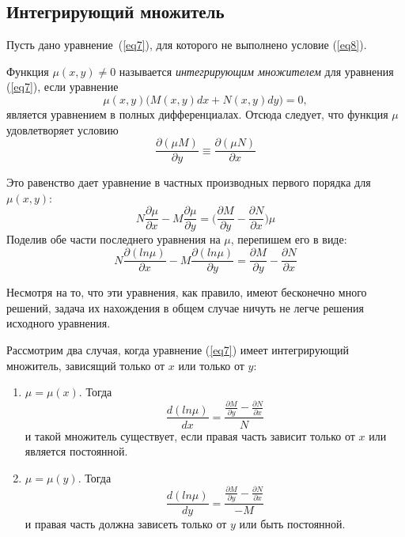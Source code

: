 \subsection*{Интегрирующий множитель}
Пусть дано уравнение~(\ref{eq7}), для которого не выполнено условие (\ref{eq8}).

\Def Функция $\mu(x, y) \neq 0$ называется \textit{интегрирующим множителем} для уравнения (\ref{eq7}), если уравнение
\begin{equation*}
    \mu(x, y)\big(M(x, y) dx + N(x, y) dy\big) = 0,
\end{equation*}
является уравнением в полных дифференциалах. Отсюда следует, что функция $\mu$ удовлетворяет условию
\begin{equation*}
    \frac{\partial(\mu M)}{\partial y} \equiv \frac{\partial(\mu N)}{\partial x}
\end{equation*}

Это равенство дает уравнение в частных производных первого порядка для $\mu(x,y)$:
\begin{equation*}
    N\frac{\partial\mu}{\partial x} - M\frac{\partial\mu}{\partial y} = \Big(\frac{\partial M}{\partial y} - \frac{\partial N}{\partial x}\Big)\mu
\end{equation*}
Поделив обе части последнего уравнения на $\mu$, перепишем его в виде:
\begin{equation*}
    N\frac{\partial(ln\mu)}{\partial x} - M\frac{\partial(ln\mu)}{\partial y} = \frac{\partial M}{\partial y} - \frac{\partial N}{\partial x}
\end{equation*}

Несмотря на то, что эти уравнения, как
правило, имеют бесконечно много решений, задача их нахождения в общем случае ничуть не легче решения исходного уравнения.

Рассмотрим два случая, когда уравнение (\ref{eq7}) имеет интегрирующий множитель, зависящий только от $x$ или только от $y$:
\begin{enumerate}
    \item $\mu = \mu(x)$. Тогда 
    \begin{equation*}
        \frac{d(ln\mu)}{d x} = \frac{\frac{\partial M}{\partial y} - \frac{\partial N}{\partial x}}{N}
    \end{equation*}
    и такой множитель существует, если правая часть зависит только от $x$ или
является постоянной.
    \item $\mu = \mu(y)$. Тогда 
    \begin{equation*}
        \frac{d(ln\mu)}{d y} = \frac{\frac{\partial M}{\partial y} - \frac{\partial N}{\partial x}}{-M}
    \end{equation*}
    и правая часть должна зависеть только от $y$ или быть постоянной.
\end{enumerate}

